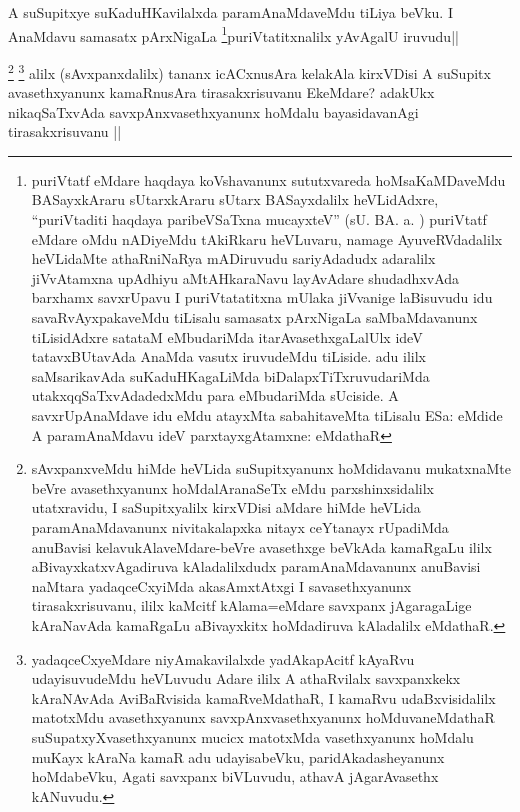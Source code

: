 \begin{artha}
A suSupitxye suKaduHKavilalxda paramAnaMdaveMdu tiLiya beVku. I AnaMdavu samasatx pArxNigaLa \footnote{puriVtatf eMdare haqdaya koVshavanunx sututxvareda hoMsaKaMDaveMdu BASayxkAraru sUtarxkAraru sUtarx BASayxdalilx heVLidAdxre, ``puriVtaditi haqdaya paribeVSaTxna mucayxteV'' (sU. BA. a. ) puriVtatf eMdare oMdu nADiyeMdu tAkiRkaru heVLuvaru, namage AyuveRVdadalilx heVLidaMte athaRniNaRya mADiruvudu sariyAdadudx adaralilx jiVvAtamxna upAdhiyu aMtAHkaraNavu layAvAdare shudadhxvAda barxhamx savxrUpavu I puriVtatatitxna mUlaka jiVvanige laBisuvudu idu savaRvAyxpakaveMdu tiLisalu samasatx pArxNigaLa saMbaMdavanunx tiLisidAdxre satataM eMbudariMda itarAvasethxgaLalUlx ideV tatavxBUtavAda AnaMda vasutx iruvudeMdu tiLiside. adu ililx saMsarikavAda suKaduHKagaLiMda biDalapxTiTxruvudariMda utakxqqSaTxvAdadedxMdu para eMbudariMda sUciside. A savxrUpAnaMdave idu eMdu atayxMta sabahitaveMta tiLisalu ESa: eMdide A paramAnaMdavu ideV parxtayxgAtamxne: eMdathaR}puriVtatitxnalilx yAvAgalU iruvudu||
\end{artha}

\begin{artha}
\footnote{sAvxpanxveMdu hiMde heVLida suSupitxyanunx hoMdidavanu mukatxnaMte beVre avasethxyanunx hoMdalAranaSeTx eMdu parxshinxsidalilx utatxravidu, I saSupitxyalilx kirxVDisi aMdare hiMde heVLida paramAnaMdavanunx nivitakalapxka nitayx ceYtanayx rUpadiMda anuBavisi kelavukAlaveMdare-beVre avasethxge beVkAda kamaRgaLu ililx aBivayxkatxvAgadiruva kAladalilxdudx paramAnaMdavanunx anuBavisi naMtara yadaqceCxyiMda akasAmxtAtxgi I savasethxyanunx tirasakxrisuvanu, ililx kaMcitf kAlama=eMdare savxpanx jAgaragaLige kAraNavAda kamaRgaLu aBivayxkitx hoMdadiruva kAladalilx eMdathaR.}
\footnote{yadaqceCxyeMdare niyAmakavilalxde yadAkapAcitf kAyaRvu udayisuvudeMdu heVLuvudu Adare ililx A athaRvilalx savxpanxkekx kAraNAvAda AviBaRvisida kamaRveMdathaR, I kamaRvu udaBxvisidalilx matotxMdu avasethxyanunx savxpAnxvasethxyanunx hoMduvaneMdathaR suSupatxyXvasethxyanunx mucicx matotxMda vasethxyanunx hoMdalu muKayx kAraNa kamaR adu udayisabeVku, paridAkadasheyanunx hoMdabeVku, Agati savxpanx biVLuvudu, athavA jAgarAvasethx kANuvudu.}
alilx (sAvxpanxdalilx) tananx icACxnusAra kelakAla kirxVDisi A suSupitx avasethxyanunx kamaRnusAra tirasakxrisuvanu EkeMdare? adakUkx nikaqSaTxvAda savxpAnxvasethxyanunx hoMdalu bayasidavanAgi tirasakxrisuvanu ||
\end{artha}


